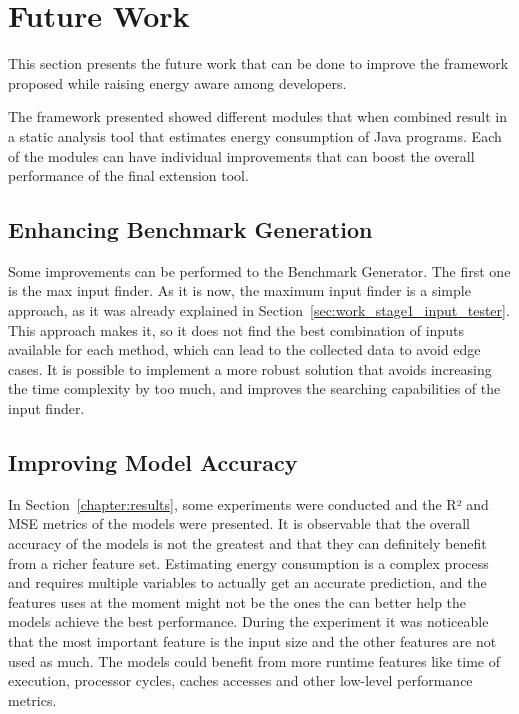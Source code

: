 \chapter{Future Work}\label{chapter:future_work}

This section presents the future work that can be done to improve the framework proposed while raising energy aware among developers.

The framework presented showed different modules that when combined result in a static analysis tool that estimates energy consumption of Java programs. Each of the modules can have individual improvements that can boost the overall performance of the final extension tool.


\section{Enhancing Benchmark Generation} \label{sec:future_work_enhancing_program_generation}

Some improvements can be performed to the Benchmark Generator. The first one is the max input finder. As it is now, the maximum input finder is a simple approach, as it was already explained in Section~\ref{sec:work_stage1_input_tester}. This approach makes it, so it does not find the best combination of inputs available for each method, which can lead to the collected data to avoid edge cases. It is possible to implement a more robust solution that avoids increasing the time complexity by too much, and improves the searching capabilities of the input finder.

\section{Improving Model Accuracy} \label{sec:future_work_improving_model_accuracy}

In Section~\ref{chapter:results}, some experiments were conducted and the R² and MSE metrics of the models were presented. It is observable that the overall accuracy of the models is not the greatest and that they can definitely benefit from a richer feature set. Estimating energy consumption is a complex process and requires multiple variables to actually get an accurate prediction, and the features uses at the moment might not be the ones the can better help the models achieve the best performance. During the experiment it was noticeable that the most important feature is the input size and the other features are not used as much. The models could benefit from more runtime features like time of execution, processor cycles, caches accesses and other low-level performance metrics.


